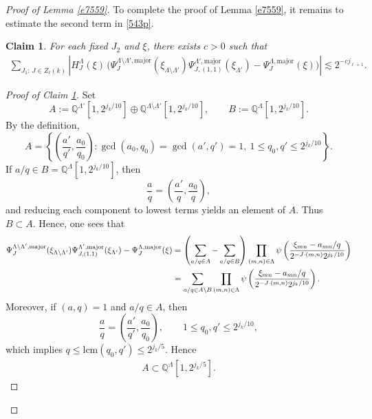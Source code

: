 \documentclass[10pt,a4paper]{amsart}
\newtheorem{claim}{Claim}\numberwithin{claim}{section}
\numberwithin{equation}{section}
\begin{document}
\begin{proof}[Proof of Lemma \ref{e7559}]
 

To complete the proof of Lemma \ref{e7559}, it remains to estimate the second term in \eqref{543p}.

\begin{claim}\label{to77}
For each fixed $J_2$ and $\xi$, there exists $c>0$ such that
\begin{align*}
\sum_{J_1:\, J\in Z_\ell(k)}
\left|
H^{\Lambda}_{J}(\xi)\,
\Big(
\Psi_J^{\Lambda\setminus\Lambda',\mathrm{major}}(\xi_{\Lambda\setminus\Lambda'})
\Psi_{J,(1,1)}^{\Lambda',\mathrm{major}}(\xi_{\Lambda'})
-
\Psi_J^{\Lambda,\mathrm{major}}(\xi)
\Big)
\right|
\lesssim 2^{-c j_{\ell+1}}.
\end{align*}
\end{claim}

\begin{proof}[Proof of Claim \ref{to77}]
Set
\[
A:=\mathbb{Q}^{\Lambda'}[1,2^{j_k/10}]\oplus\mathbb{Q}^{\Lambda\setminus \Lambda'}[1,2^{j_k/10}],
\qquad
B:=\mathbb{Q}^{\Lambda}[1,2^{j_k/10}].
\]
By the definition,
\[
A
=
\left\{
\left(\frac{a'}{q'},\frac{a_0}{q_0}\right):
\gcd(a_0,q_0)=\gcd(a',q')=1,\ 
1\le q_0,q'\le 2^{j_k/10}
\right\}.
\]
If $a/q\in B=\mathbb{Q}^{\Lambda}[1,2^{j_k/10}]$, then
\[
\frac{a}{q}
=
\left(\frac{a'}{q},\frac{a_0}{q}\right),
\]
and reducing each component to lowest terms yields an element of $A$.
Thus $B\subset A$. Hence, one sees that
\begin{align}
\Psi_{J}^{\Lambda\setminus \Lambda',\mathrm{major}}(\xi_{\Lambda\setminus\Lambda'})
\Psi_{J,(1,1)}^{\Lambda',\mathrm{major}}(\xi_{\Lambda'})
-
\Psi_{J}^{\Lambda,\mathrm{major}}(\xi)
&=
\left(\sum_{a/q\in A}-\sum_{a/q\in B}\right)
\prod_{(m,n)\in\Lambda}
\psi\left(
\frac{\xi_{mn}-a_{mn}/q}{2^{-J\cdot(m,n)}2^{j_k/10}}
\right)\notag \\
&=
\sum_{a/q\in A\setminus B}
\prod_{(m,n)\in\Lambda}
\psi\left(
\frac{\xi_{mn}-a_{mn}/q}{2^{-J\cdot(m,n)}2^{j_k/10}}
\right).\label{t6}
\end{align}
Moreover, if $(a,q)=1$ and $a/q\in A$, then
\[
\frac{a}{q}
=
\left(\frac{a'}{q'},\frac{a_0}{q_0}\right),
\qquad
1\le q_0,q'\le 2^{j_k/10},
\]
which implies
$q \le \mathrm{lcm}(q_0,q') \le 2^{j_k/5}.$
Hence \begin{align}\label{ii}
	A\subset \mathbb{Q}^{\Lambda}[1,2^{j_k/5}].
\end{align}


\end{proof}
\end{proof}
\end{document}
